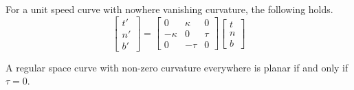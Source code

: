\documentclass[11pt]{article}
\theoremstyle{definition}
\theoremstyle{remark}
\numberwithin{equation}{section}
\begin{document}
    \begin{theorem}
        For a unit speed curve with nowhere vanishing curvature, the following holds.
        \[
            \begin{bmatrix}
                t' \\ n' \\ b'
            \end{bmatrix} = \begin{bmatrix}
                0 & \kappa & 0 \\
                -\kappa  & 0 & \tau \\
                0 & -\tau & 0 
            \end{bmatrix} \begin{bmatrix}
                t \\ n \\ b
            \end{bmatrix}
        \]
    \end{theorem}
    \begin{corollary}
        A regular space curve with non-zero curvature everywhere is planar if and
        only if $\tau = 0$.
    \end{corollary}
    
\end{document}

